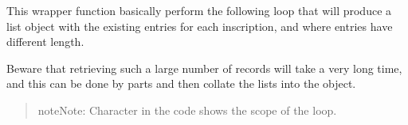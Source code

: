 \documentclass[a4paper,12pt,english]{sphinxhowto}
\begin{document}

\ignorespaces 
\def\sphinxLiteralBlockLabel{\label{\detokenize{Epigraphic:index-0}}}
\begin{sphinxVerbatim}[commandchars=\\\{\},formatcom=\footnotesize]
     

 

 
\end{sphinxVerbatim}

This wrapper function basically perform the following loop that
will produce a list object with the existing entries for each inscription,
and where entries have different length.

\begin{sphinxVerbatim}[commandchars=\\\{\},formatcom=\footnotesize]
   
    
    \PYG{n}{[}\PYG{n+nf}{[length}\PYG{n}{]}\PYG{n}{]}  
    
\end{sphinxVerbatim}

Beware that retrieving such a large number of records will take a very long time,
and this can be done by parts and then collate the lists into the  object.
\begin{quote}

\begin{sphinxadmonition}{note}{Note:}
Character \sphinxcode{\sphinxupquote{+}} in the code shows the scope of the loop.
\end{sphinxadmonition}
\end{quote}
\end{document}
